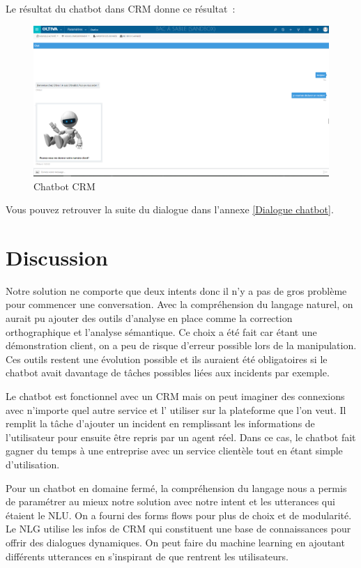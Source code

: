 Le résultat du chatbot dans CRM donne ce résultat :

\begin{figure}[H]
	\centering
		\includegraphics[width = \textwidth]{chat.png}
	\caption{Chatbot CRM}
	\label{fig:Chatbot CRM}
\end{figure}

Vous pouvez retrouver la suite du dialogue dans l’annexe \ref{Dialogue chatbot}.

\section{Discussion}


Notre solution ne comporte que deux intents donc il n’y a pas de gros problème pour commencer une conversation. Avec la compréhension du langage naturel, on aurait pu ajouter des outils d’analyse en place comme la correction orthographique et l’analyse sémantique. Ce choix a été fait car étant une démonstration client, on a peu de risque d’erreur possible lors de la manipulation. Ces outils restent une évolution possible et ils auraient été obligatoires  si le chatbot avait davantage de tâches possibles liées aux incidents par exemple.
\vspace{1em}

Le chatbot est fonctionnel avec un CRM mais on peut imaginer des connexions avec n’importe quel autre service et l’ utiliser sur la plateforme que l’on veut. Il remplit la tâche d’ajouter un incident en remplissant les informations de l’utilisateur pour ensuite être repris par un agent réel. Dans ce cas, le chatbot fait gagner du temps à une entreprise avec un service clientèle tout en étant simple d’utilisation.
\vspace{1em}

Pour un chatbot en domaine fermé, la compréhension du langage nous a permis de paramétrer au mieux notre solution avec notre intent et les utterances qui étaient le NLU. On a fourni des forms flows pour plus de choix et de modularité. Le NLG utilise les infos de CRM qui constituent une base de connaissances pour offrir des dialogues dynamiques. On peut faire du machine learning en ajoutant différents utterances en s’inspirant de que rentrent les utilisateurs.




